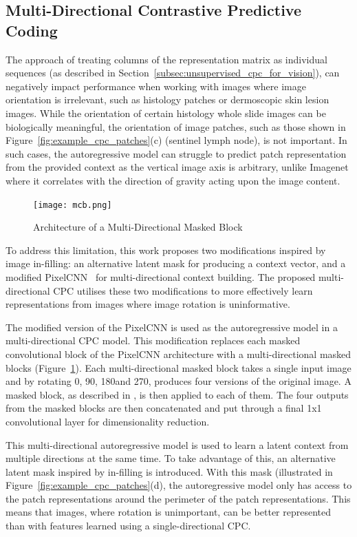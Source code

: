 \subsection{Multi-Directional Contrastive Predictive Coding}
\label{subsec:unsupervised_mdcpc}
The approach of treating columns of the representation matrix as individual sequences (as described in Section~\ref{subsec:unsupervised_cpc_for_vision}), can negatively impact performance when working with images where image orientation is irrelevant, such as histology patches or dermoscopic skin lesion images. While the orientation of certain histology whole slide images can be biologically meaningful, the orientation of image patches, such as those shown in Figure~\ref{fig:example_cpc_patches}(c) (sentinel lymph node), is not important. In such cases, the autoregressive model can struggle to predict patch representation from the provided context as the vertical image axis is arbitrary, unlike Imagenet where it correlates with the direction of gravity acting upon the image content.

\begin{figure}
	\centering
	\texttt{[image: mcb.png]}
	\caption{Architecture of a Multi-Directional Masked Block}
	\label{fig:multi-directional_masked_block}
\end{figure}

To address this limitation, this work proposes two modifications inspired by image in-filling: an alternative latent mask for producing a context vector, and a modified PixelCNN~\citep{oord2016pixel} for multi-directional context building. The proposed multi-directional CPC utilises these two modifications to more effectively learn representations from images where image rotation is uninformative.

The modified version of the PixelCNN is used as the autoregressive model in a multi-directional CPC model. This modification replaces each masked convolutional block of the PixelCNN architecture with a multi-directional masked blocks (Figure~\ref{fig:multi-directional_masked_block}). Each multi-directional masked block takes a single input image and by rotating 0\textdegree, 90\textdegree, 180\textdegree and 270\textdegree, produces four versions of the original image. A masked block, as described in \cite{oord2016pixel}, is then applied to each of them. The four outputs from the masked blocks are then concatenated and put through a final 1x1 convolutional layer for dimensionality reduction.

This multi-directional autoregressive model is used to learn a latent context from multiple directions at the same time. To take advantage of this, an alternative latent mask inspired by in-filling is introduced. With this mask (illustrated in Figure~\ref{fig:example_cpc_patches}(d), the autoregressive model only has access to the patch representations around the perimeter of the patch representations. This means that images, where rotation is unimportant, can be better represented than with features learned using a single-directional CPC.



